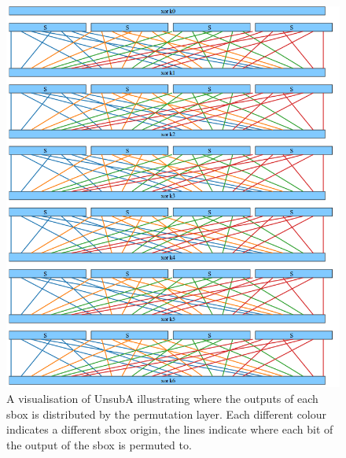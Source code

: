 \documentclass[12pt,a4paper]{article}
\begin{document}
\begin{figure}[P]
\includegraphics[width=\textwidth]{diagrams/sbox}
\caption[Visualisation of UnsubA Permutation emphasising Sbox Origin]{A
visualisation of UnsubA illustrating where the outputs of each sbox is
distributed by the permutation layer. Each different colour indicates a
different sbox origin, the lines indicate where each bit of the output of the
sbox is permuted to.}
\label{fig:sbox}
\end{figure}
\end{document}
